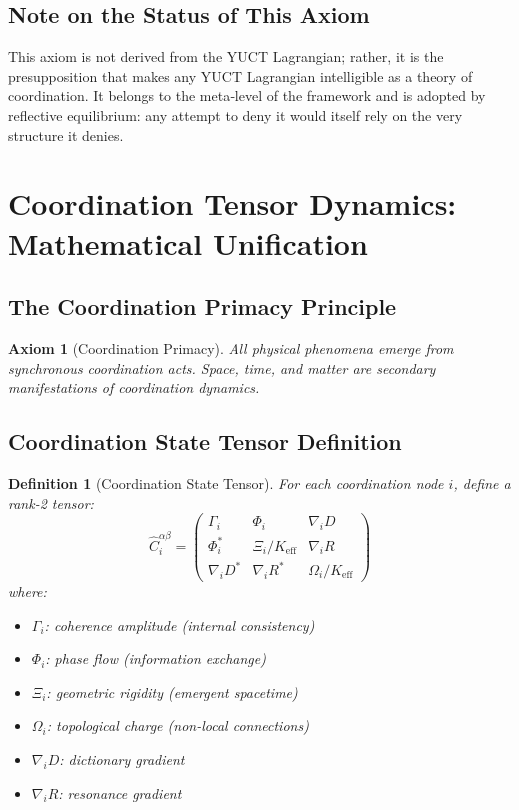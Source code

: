 \documentclass[11pt,a4paper]{article}
\newtheorem{axiom}{Axiom}
\newtheorem{definition}{Definition}
\begin{document}
\subsection*{Note on the Status of This Axiom}
This axiom is not derived from the YUCT Lagrangian; rather, it is the presupposition that makes any YUCT Lagrangian intelligible as a theory of coordination. It belongs to the meta‑level of the framework and is adopted by reflective equilibrium: any attempt to deny it would itself rely on the very structure it denies.

\section{Coordination Tensor Dynamics: Mathematical Unification}
\label{sec:ctd-unification}

\subsection{The Coordination Primacy Principle}
\begin{axiom}[Coordination Primacy]
	All physical phenomena emerge from synchronous coordination acts. 
	Space, time, and matter are secondary manifestations of coordination dynamics.
\end{axiom}

\subsection{Coordination State Tensor Definition}

\begin{definition}[Coordination State Tensor]
	For each coordination node $i$, define a rank-2 tensor:
	\[
	\hat{C}_i^{\alpha\beta} = \begin{pmatrix}
		\Gamma_i & \Phi_i & \nabla_i D \\
		\Phi_i^* & \Xi_i/K_{\mathrm{eff}} & \nabla_i R \\
		\nabla_i D^* & \nabla_i R^* & \Omega_i/K_{\mathrm{eff}}
	\end{pmatrix}
	\]
	where:
	\begin{itemize}
		\item $\Gamma_i$: coherence amplitude (internal consistency)
		\item $\Phi_i$: phase flow (information exchange)  
		\item $\Xi_i$: geometric rigidity (emergent spacetime)
		\item $\Omega_i$: topological charge (non-local connections)
		\item $\nabla_i D$: dictionary gradient
		\item $\nabla_i R$: resonance gradient
	\end{itemize}
\end{definition}
\end{document}
